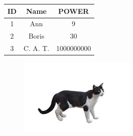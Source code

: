 \documentclass{article}
\begin{document}
\begin{table}[h]
\centering
\begin{tabular}{ | c | c | c | }
\hline
ID & Name & POWER \\
\hline
1 & Ann & 9 \\
\hline
2 & Boris & 30 \\
\hline
3 & C. A. T. & 1000000000 \\
\hline
\end{tabular}
\label{tab:example}
\end{table}


\begin{figure}[h]
    \centering
    \includegraphics[width=0.5\textwidth]{example.png}
    \label{fig:example}
\end{figure}
\end{document}
